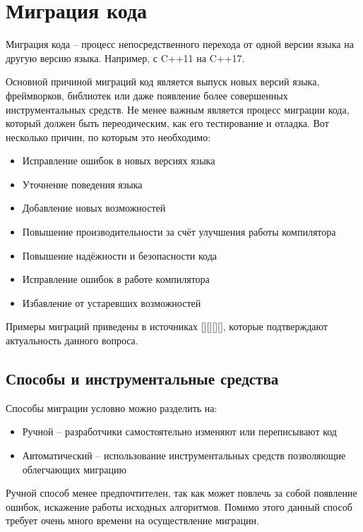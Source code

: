 \documentclass{article}
\begin{document}
	\section{Миграция кода}

	Миграция кода -- процесс непосредственного перехода от одной версии языка на другую версию языка. Например, с C++11 на C++17.

	Основной причиной миграций код является выпуск новых версий языка, фреймворков, библиотек или даже появление более совершенных инструментальных средств. Не менее важным является процесс миграции кода, который должен быть переодическим, как его тестирование и отладка. Вот несколько причин, по которым это необходимо:

	\begin{itemize}
		\item{Исправление ошибок в новых версиях языка}
		\item{Уточнение поведения языка}
		\item{Добавление новых возможностей}
		\item{Повышение производительности за счёт улучшения работы компилятора}
		\item{Повышение надёжности и безопасности кода}
		\item{Исправление ошибок в работе компилятора}
		\item{Избавление от устаревших возможностей}
	\end{itemize}
	
	Примеры миграций приведены в источниках [\theexample][\theexample][\theexample][\theexample], которые подтверждают актуальность данного вопроса.

	\subsection{Способы и инструментальные средства}

	Способы миграции условно можно разделить на: 

	\begin{itemize}
		\item{Ручной -- разработчики самостоятельно изменяют или переписывают код}
		\item{Автоматический -- использование инструментальных средств позволяющие облегчающих миграцию}
	\end{itemize}

	Ручной способ менее предпочтителен, так как может повлечь за собой появление ошибок, искажение работы исходных алгоритмов. Помимо этого данный способ требует очень много времени на осуществление миграции.
\end{document}

